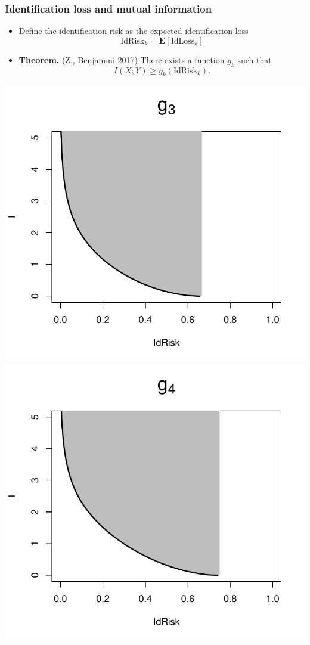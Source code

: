\documentclass{beamer}
\newcommand{\E}{\textbf{E}}
\begin{document}


\begin{frame}
\frametitle{Identification loss and mutual information}
\begin{itemize}
\item Define the identification risk as the expected identification loss
\[
\text{IdRisk}_k = \E[\text{IdLoss}_k]
\]
\item \textbf{Theorem.} (Z., Benjamini 2017) There exists a function $g_k$ such that
\[I(X; Y) \geq g_k(\text{IdRisk}_k).\]
\end{itemize}
\begin{center}
\includegraphics[scale = 0.4]{../idloss/g3.pdf}
\includegraphics[scale = 0.4]{../idloss/g4.pdf}

\end{center}
\end{frame}
\end{document}
